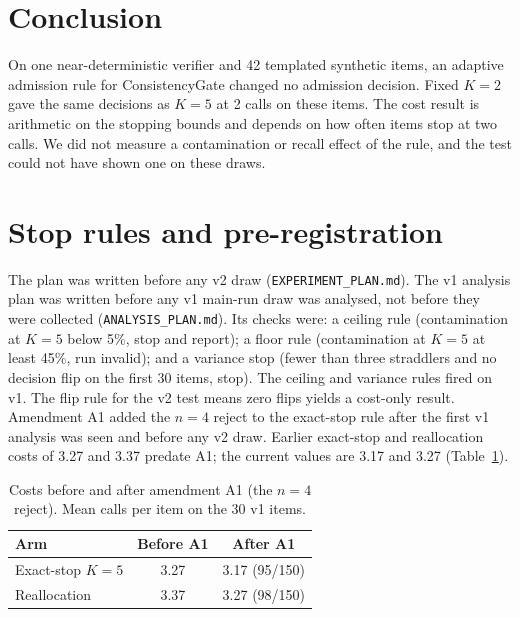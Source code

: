 \documentclass[11pt]{article}
\begin{document}
\section{Conclusion}
On one near-deterministic verifier and 42 templated synthetic items, an adaptive admission rule for ConsistencyGate changed no admission decision. Fixed $K{=}2$ gave the same decisions as $K{=}5$ at 2 calls on these items. The cost result is arithmetic on the stopping bounds and depends on how often items stop at two calls. We did not measure a contamination or recall effect of the rule, and the test could not have shown one on these draws.

\appendix
\section{Stop rules and pre-registration}\label{app:stop}
The plan was written before any v2 draw (\texttt{EXPERIMENT\_PLAN.md}). The v1 analysis plan was written before any v1 main-run draw was analysed, not before they were collected (\texttt{ANALYSIS\_PLAN.md}). Its checks were: a ceiling rule (contamination at $K{=}5$ below 5\%, stop and report); a floor rule (contamination at $K{=}5$ at least 45\%, run invalid); and a variance stop (fewer than three straddlers and no decision flip on the first 30 items, stop). The ceiling and variance rules fired on v1. The flip rule for the v2 test means zero flips yields a cost-only result. Amendment A1 added the $n{=}4$ reject to the exact-stop rule after the first v1 analysis was seen and before any v2 draw. Earlier exact-stop and reallocation costs of 3.27 and 3.37 predate A1; the current values are 3.17 and 3.27 (Table~\ref{tab:before}).

\begin{table}[h]
\centering
\caption{Costs before and after amendment A1 (the $n{=}4$ reject). Mean calls per item on the 30 v1 items.}
\label{tab:before}
\begin{tabular}{lcc}
\toprule
Arm & Before A1 & After A1 \\
\midrule
Exact-stop $K{=}5$ & 3.27 & 3.17 (95/150) \\
Reallocation & 3.37 & 3.27 (98/150) \\
\bottomrule
\end{tabular}
\end{table}
\end{document}
